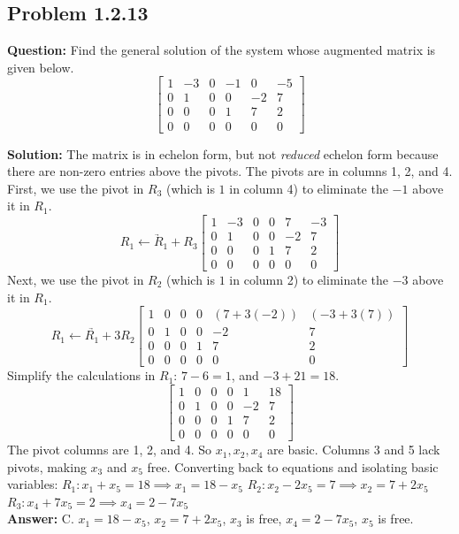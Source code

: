 \documentclass[11pt]{article}
\begin{document}
\subsection*{Problem 1.2.13}
\textbf{Question:} Find the general solution of the system whose augmented matrix is given below.
\[ \begin{bmatrix} 1 & -3 & 0 & -1 & 0 & -5 \\ 0 & 1 & 0 & 0 & -2 & 7 \\ 0 & 0 & 0 & 1 & 7 & 2 \\ 0 & 0 & 0 & 0 & 0 & 0 \end{bmatrix} \]

\textbf{Solution:}
The matrix is in echelon form, but not \textit{reduced} echelon form because there are non-zero entries above the pivots. The pivots are in columns 1, 2, and 4.
First, we use the pivot in $R_3$ (which is $1$ in column 4) to eliminate the $-1$ above it in $R_1$.
\[ \underrightarrow{R_1 \leftarrow R_1 + R_3} \begin{bmatrix} 1 & -3 & 0 & 0 & 7 & -3 \\ 0 & 1 & 0 & 0 & -2 & 7 \\ 0 & 0 & 0 & 1 & 7 & 2 \\ 0 & 0 & 0 & 0 & 0 & 0 \end{bmatrix} \]
Next, we use the pivot in $R_2$ (which is $1$ in column 2) to eliminate the $-3$ above it in $R_1$.
\[ \underrightarrow{R_1 \leftarrow R_1 + 3R_2} \begin{bmatrix} 1 & 0 & 0 & 0 & (7 + 3(-2)) & (-3 + 3(7)) \\ 0 & 1 & 0 & 0 & -2 & 7 \\ 0 & 0 & 0 & 1 & 7 & 2 \\ 0 & 0 & 0 & 0 & 0 & 0 \end{bmatrix} \]
Simplify the calculations in $R_1$: $7 - 6 = 1$, and $-3 + 21 = 18$.
\[ \begin{bmatrix} 1 & 0 & 0 & 0 & 1 & 18 \\ 0 & 1 & 0 & 0 & -2 & 7 \\ 0 & 0 & 0 & 1 & 7 & 2 \\ 0 & 0 & 0 & 0 & 0 & 0 \end{bmatrix} \]
The pivot columns are 1, 2, and 4. So $x_1, x_2, x_4$ are basic. Columns 3 and 5 lack pivots, making $x_3$ and $x_5$ free.
Converting back to equations and isolating basic variables:
$R_1: x_1 + x_5 = 18 \implies x_1 = 18 - x_5$
$R_2: x_2 - 2x_5 = 7 \implies x_2 = 7 + 2x_5$
$R_3: x_4 + 7x_5 = 2 \implies x_4 = 2 - 7x_5$
\\
\textbf{Answer:} C. $x_1 = 18 - x_5$, $x_2 = 7 + 2x_5$, $x_3$ is free, $x_4 = 2 - 7x_5$, $x_5$ is free.
\end{document}
